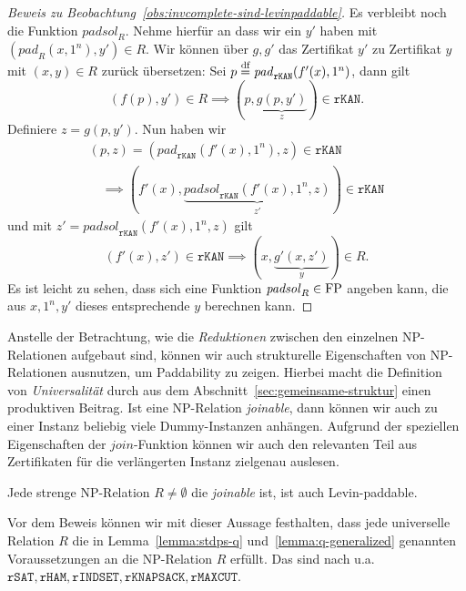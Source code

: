 \begin{proof}[Beweis zu Beobachtung~\ref{obs:invcomplete-sind-levinpaddable}]
    Es verbleibt noch die Funktion $\mathit{padsol}_R$. Nehme hierfür an dass wir ein $y'$ haben mit $(\mathit{pad}_R(x, 1^n), y')\in R$.
    Wir können über $g, g'$ das Zertifikat $y'$ zu Zertifikat $y$ mit $(x, y)\in R$ zurück übersetzen:
    Sei $p\stackrel{\text{df}}{=} \mathit{pad}_\mathtt{rKAN}(f'(x), 1^n)$, dann gilt
    \[ (f(p), y')\in R \implies (p, \underbrace{g(p, y')}_z)\in \mathtt{rKAN}. \]
    Definiere $z=g(p, y')$.
    Nun haben wir
    \begin{gather*} (p, z)=(\mathit{pad}_\mathtt{rKAN}(f'(x), 1^n), z)\in\mathtt{rKAN}  \\\quad\implies (f'(x), \underbrace{\mathit{padsol}_\mathtt{rKAN}(f'(x), 1^n, z)}_{z'})\in\mathtt{rKAN} \end{gather*}
    und mit $z'=\mathit{padsol}_\mathtt{rKAN}(f'(x), 1^n, z)$ gilt
    \[ (f'(x), z') \in \mathtt{rKAN} \implies (x, \underbrace{g'(x, z')}_{y}) \in R. \]
    Es ist leicht zu sehen, dass sich eine Funktion $\mathit{padsol}_R\in\mathrm{FP}$ angeben kann, die aus $x, 1^n, y'$ dieses entsprechende $y$ berechnen kann.
\end{proof}

Anstelle der Betrachtung, wie die \emph{Reduktionen} zwischen den einzelnen NP-Relationen aufgebaut sind, können wir auch strukturelle Eigenschaften von NP-Relationen ausnutzen, um Paddability zu zeigen. Hierbei macht die Definition von \emph{Universalität} durch \textcite{agrawal_universal_1992} aus dem Abschnitt~\ref{sec:gemeinsame-struktur} einen produktiven Beitrag. Ist eine NP-Relation \emph{joinable}, dann können wir auch zu einer Instanz beliebig viele Dummy-Instanzen anhängen. Aufgrund der speziellen Eigenschaften der $\mathit{join}$-Funktion können wir auch den relevanten Teil aus Zertifikaten für die verlängerten Instanz zielgenau auslesen. 

\begin{observation}\label{obs:joinable-sind-levinpaddable}
    Jede strenge NP-Relation $R\neq\emptyset$ die \emph{joinable} ist, ist auch Levin-paddable. 
\end{observation}
Vor dem Beweis können wir mit dieser Aussage festhalten, dass jede universelle Relation $R$ die in 
Lemma~\ref{lemma:stdps-q} und~\ref{lemma:q-generalized} genannten Voraussetzungen an die NP-Relation $R$ erfüllt.
Das sind nach \textcite{agrawal_universal_1992} u.a. $\mathtt{rSAT}, \mathtt{rHAM}, \mathtt{rINDSET}, \mathtt{rKNAPSACK}, \mathtt{rMAXCUT}$.

